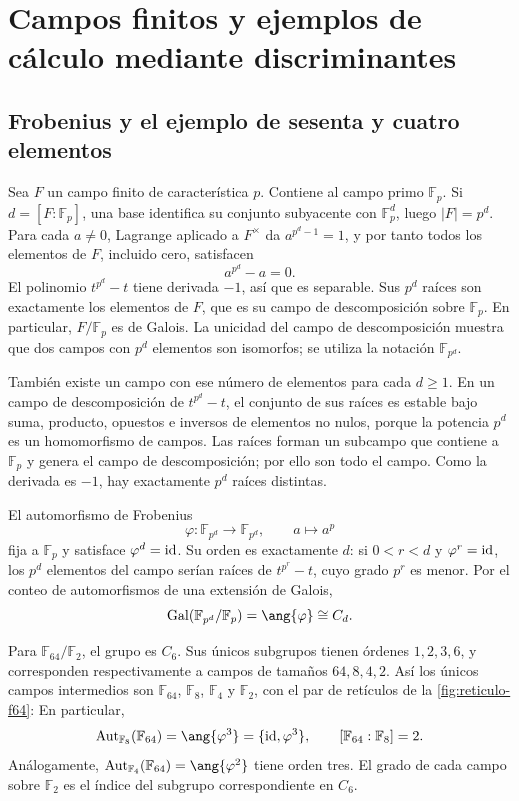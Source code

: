 \section{Campos finitos y ejemplos de cálculo mediante discriminantes}\label{sec:campos-finitos}

\subsection{Frobenius y el ejemplo de sesenta y cuatro elementos}\label{tema:27-2-2}
Sea $F$ un campo finito de característica $p$. Contiene al campo primo $\mathbb F_p$. Si $d=[F:\mathbb F_p]$, una base identifica su conjunto subyacente con $\mathbb F_p^d$, luego $|F|=p^d$. Para cada $a\ne0$, Lagrange aplicado a $F^\times$ da $a^{p^d-1}=1$, y por tanto todos los elementos de $F$, incluido cero, satisfacen
\[
a^{p^d}-a=0.
\]
El polinomio $t^{p^d}-t$ tiene derivada $-1$, así que es separable. Sus $p^d$ raíces son exactamente los elementos de $F$, que es su campo de descomposición sobre $\mathbb F_p$. En particular, $F/\mathbb F_p$ es de Galois. La unicidad del campo de descomposición muestra que dos campos con $p^d$ elementos son isomorfos; se utiliza la notación $\mathbb F_{p^d}$.

También existe un campo con ese número de elementos para cada $d\geq1$. En un campo de descomposición de $t^{p^d}-t$, el conjunto de sus raíces es estable bajo suma, producto, opuestos e inversos de elementos no nulos, porque la potencia $p^d$ es un homomorfismo de campos. Las raíces forman un subcampo que contiene a $\mathbb F_p$ y genera el campo de descomposición; por ello son todo el campo. Como la derivada es $-1$, hay exactamente $p^d$ raíces distintas.

El automorfismo de Frobenius
\[
\varphi:\mathbb F_{p^d}\longrightarrow\mathbb F_{p^d},
\qquad a\longmapsto a^p
\]
fija a $\mathbb F_p$ y satisface $\varphi^d=\operatorname{id}$. Su orden es exactamente $d$: si $0<r<d$ y $\varphi^r=\operatorname{id}$, los $p^d$ elementos del campo serían raíces de $t^{p^r}-t$, cuyo grado $p^r$ es menor. Por el conteo de automorfismos de una extensión de Galois,
\[
\gal(\mathbb F_{p^d}/\mathbb F_p)=\ang{\varphi}\cong C_d.
\]

\begin{ejem}\label{ejem:C27-f64}
Para $\mathbb F_{64}/\mathbb F_2$, el grupo es $C_6$. Sus únicos subgrupos tienen órdenes $1,2,3,6$, y corresponden respectivamente a campos de tamaños $64,8,4,2$. Así los únicos campos intermedios son $\mathbb F_{64}$, $\mathbb F_8$, $\mathbb F_4$ y $\mathbb F_2$, con el par de retículos de la \cref{fig:reticulo-f64}:
En particular,
\[
\Aut_{\mathbb F_8}(\mathbb F_{64})=\ang{\varphi^3}=\{\id,\varphi^3\},
\qquad [\mathbb F_{64}:\mathbb F_8]=2.
\]
Análogamente, $\Aut_{\mathbb F_4}(\mathbb F_{64})=\ang{\varphi^2}$ tiene orden tres. El grado de cada campo sobre $\mathbb F_2$ es el índice del subgrupo correspondiente en $C_6$.
\end{ejem}

